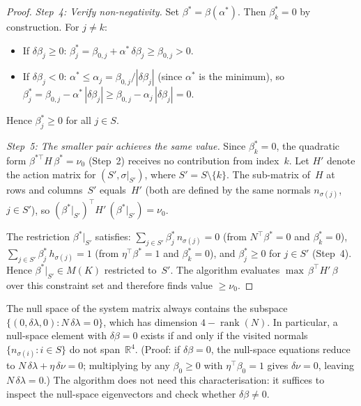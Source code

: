 \begin{proof}
\emph{Step~4: Verify non-negativity.}
Set $\beta^* = \beta(\alpha^*)$.
Then $\beta^*_k = 0$ by construction.
For $j \neq k$:
\begin{itemize}
\item If $\delta\beta_j \geq 0$:
  $\beta^*_j = \beta_{0,j} + \alpha^*\,\delta\beta_j
    \geq \beta_{0,j} > 0$.
\item If $\delta\beta_j < 0$:
  $\alpha^* \leq \alpha_j = \beta_{0,j}/|\delta\beta_j|$
  (since $\alpha^*$ is the minimum), so
  $\beta^*_j
    = \beta_{0,j} - \alpha^*\,|\delta\beta_j|
    \geq \beta_{0,j} - \alpha_j\,|\delta\beta_j| = 0$.
\end{itemize}
Hence $\beta^*_j \geq 0$ for all $j \in S$.

\emph{Step~5: The smaller pair achieves the same value.}
Since $\beta^*_k = 0$, the quadratic form
$\beta^{*\top} H\, \beta^* = \nu_0$ (Step~2)
receives no contribution from index~$k$.
Let $H'$ denote the action matrix for
$(S', \sigma|_{S'})$, where $S' = S \setminus \{k\}$.
The sub-matrix of~$H$ at rows and columns~$S'$
equals~$H'$ (both are defined by the same normals
$n_{\sigma(j)}$, $j \in S'$), so
$(\beta^*|_{S'})^\top H'\, (\beta^*|_{S'}) = \nu_0$.

The restriction $\beta^*|_{S'}$ satisfies:
$\sum_{j \in S'} \beta^*_j\, n_{\sigma(j)} = 0$
(from $N^\top \beta^* = 0$ and $\beta^*_k = 0$),
$\sum_{j \in S'} \beta^*_j\, h_{\sigma(j)} = 1$
(from $\eta^\top \beta^* = 1$ and $\beta^*_k = 0$),
and $\beta^*_j \geq 0$ for $j \in S'$ (Step~4).
Hence $\beta^*|_{S'} \in M(K)$ restricted to~$S'$.
The algorithm evaluates
$\max\, \beta^\top H'\, \beta$ over this constraint set
and therefore finds value $\geq \nu_0$.
\end{proof}

\begin{remark}%
\label{rem:nullspace-geometry}
The null space of the system matrix always contains the subspace
$\{(0, \delta\lambda, 0) : N\,\delta\lambda = 0\}$, which has
dimension $4 - \operatorname{rank}(N)$.
In particular, a null-space element with $\delta\beta = 0$
exists if and only if the visited normals
$\{n_{\sigma(i)} : i \in S\}$ do not span~$\mathbb{R}^4$.
(Proof: if $\delta\beta = 0$, the null-space equations reduce to
$N\,\delta\lambda + \eta\,\delta\nu = 0$; multiplying by any
$\beta_0 \geq 0$ with $\eta^\top\!\beta_0 = 1$ gives $\delta\nu = 0$,
leaving $N\,\delta\lambda = 0$.)
The algorithm does not need this characterisation: it suffices
to inspect the null-space eigenvectors and check whether
$\delta\beta \neq 0$.
\end{remark}


